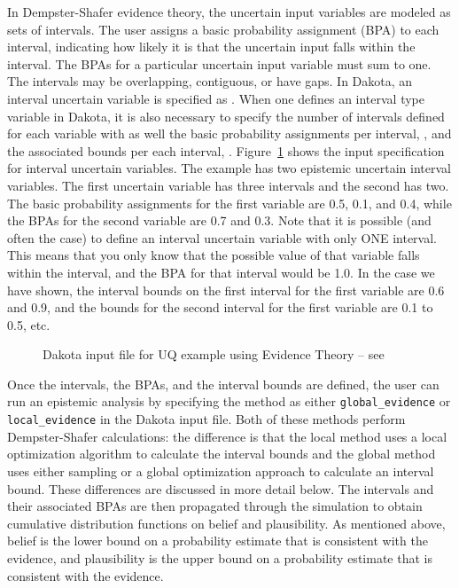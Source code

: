 In Dempster-Shafer evidence theory, the uncertain input variables are
modeled as sets of intervals. The user assigns a basic probability
assignment (BPA) to each interval, indicating how likely it is that
the uncertain input falls within the interval. The BPAs for a
particular uncertain input variable must sum to one. The intervals
may be overlapping, contiguous, or have gaps. In Dakota, an interval
uncertain variable is specified as . When
one defines an interval type variable in Dakota, it is also necessary
to specify the number of intervals defined for each variable with
 as well the basic probability assignments
per interval, , and the associated bounds
per each interval, . 
Figure~\ref{uq:figure16} shows the input specification for interval
uncertain variables. 
The example has two epistemic uncertain interval variables. 
The first uncertain
variable has three intervals and the second has two. The basic
probability assignments for the first variable are 0.5, 0.1, and 0.4,
while the BPAs for the second variable are 0.7 and 0.3. Note that it
is possible (and often the case) to define an interval uncertain
variable with only ONE interval. This means that you only know that
the possible value of that variable falls within the interval, and the
BPA for that interval would be 1.0. In the case we have shown, the
interval bounds on the first interval for the first variable are 0.6
and 0.9, and the bounds for the second interval for the first variable
are 0.1 to 0.5, etc.

\begin{figure}[htbp!]
  \centering
  \begin{bigbox}
    \begin{small}
    \end{small}
  \end{bigbox}
\caption{Dakota input file for UQ example using Evidence Theory --
see \protect{} }
\label{uq:figure16}
\end{figure}

Once the intervals, the BPAs, and the interval bounds are defined, 
the user can run an epistemic analysis by specifying the method as 
either \texttt{global\_evidence} or 
\texttt{local\_evidence} in the Dakota input file. 
Both of these methods perform Dempster-Shafer calculations:  
the difference is that the local method uses a local optimization 
algorithm to calculate the interval bounds and the global 
method uses either sampling or a global optimization approach to 
calculate an interval bound. These differences are discussed in 
more detail below. 
The intervals and their associated BPAs are then propagated through
the simulation to obtain cumulative distribution functions on belief
and plausibility. As mentioned above, belief is the lower bound on a
probability estimate that is consistent with the evidence, and
plausibility is the upper bound on a probability estimate that is
consistent with the evidence. 

